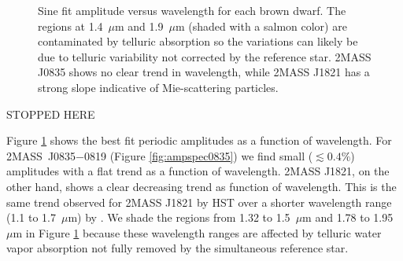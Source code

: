 \documentclass[twocolumn]{aastex6}
\newcommand{\sha}{2MASS~J0835$-$0819}
\begin{document}
\begin{figure}
\centering
{}
	\caption{Sine fit amplitude versus wavelength for each brown dwarf. The regions at 1.4~$\mu$m and 1.9~$\mu$m (shaded with a salmon color) are contaminated by telluric absorption so the variations can likely be due to telluric variability not corrected by the reference star. 2MASS J0835 shows no clear trend in wavelength, while 2MASS J1821 has a strong slope indicative of Mie-scattering particles.}
	\label{fig:ampSpec}
\end{figure} 

STOPPED HERE

Figure \ref{fig:ampSpec} shows the best fit periodic amplitudes as a function of wavelength.
For {\sha} (Figure \ref{fig:ampspec0835}) we find small ($\lesssim 0.4\%$) amplitudes with a flat trend as a function of wavelength.
2MASS J1821, on the other hand, shows a clear decreasing trend as function of wavelength.
This is the same trend observed for 2MASS J1821 by HST over a shorter wavelength range (1.1 to 1.7~$\mu$m) by \citet{2015ApJ...798L..13Y}.
We shade the regions from 1.32 to 1.5~$\mu$m and 1.78 to 1.95~$\mu$m in Figure \ref{fig:ampSpec} because these wavelength ranges are affected by telluric water vapor absorption not fully removed by the simultaneous reference star.

\end{document}
